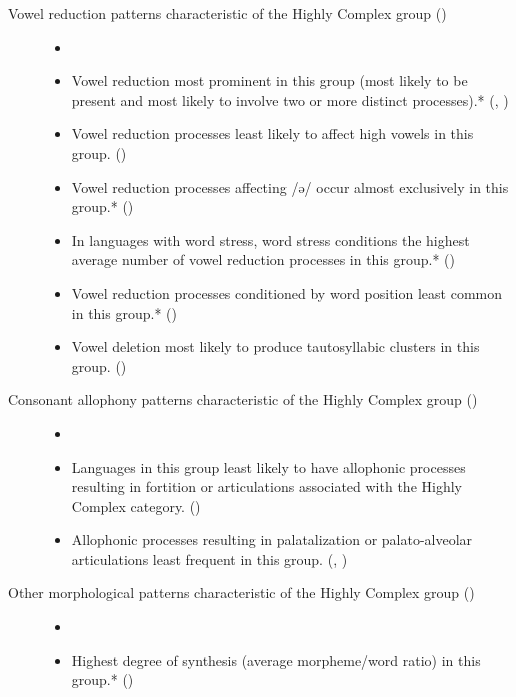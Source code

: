 \begin{description}
\item[Vowel reduction patterns characteristic of the Highly Complex group ()]

\begin{itemize}[leftmargin=*]
\item[]
\item Vowel reduction most prominent in this group (most likely to be present and most likely to involve two or more distinct processes).* {(, )}
\item Vowel reduction processes least likely to affect high vowels in this group. {()}
\item Vowel reduction processes affecting /ə/ occur almost exclusively in this group.* ()
\item In languages with word stress, word stress conditions the highest average number of vowel reduction processes in this group.* ()
\item Vowel reduction processes conditioned by word position least common in this group.* ()
\item Vowel deletion most likely to produce tautosyllabic clusters in this group. ()
\end{itemize}

\item[Consonant allophony patterns characteristic of the Highly Complex group ()]

\begin{itemize}[leftmargin=*]
\item[]
\item Languages in this group least likely to have allophonic processes resulting in fortition or articulations associated with the Highly Complex category. ()
\item Allophonic processes resulting in palatalization or palato-alveolar articulations least frequent in this group. {(, )}
\end{itemize}

\item[Other morphological patterns characteristic of the Highly Complex group ()]

\begin{itemize}[leftmargin=*]
\item[]
\item Highest degree of synthesis (average morpheme/word ratio) in this group.* {()}
\end{itemize}
\end{description}

